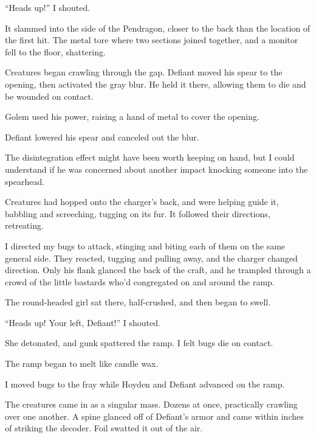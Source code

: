 ``Heads up!'' I shouted.



It slammed into the side of the Pendragon, closer to the back than the location of the first hit.  The metal tore where two sections joined together, and a monitor fell to the floor, shattering.



Creatures began crawling through the gap.  Defiant moved his spear to the opening, then activated the gray blur.  He held it there, allowing them to die and be wounded on contact.



Golem used his power, raising a hand of metal to cover the opening.



Defiant lowered his spear and canceled out the blur.



The disintegration effect might have been worth keeping on hand, but I could understand if he was concerned about another impact knocking someone into the spearhead.



Creatures had hopped onto the charger's back, and were helping guide it, babbling and screeching, tugging on its fur.  It followed their directions, retreating.



I directed my bugs to attack, stinging and biting each of them on the same general side.  They reacted, tugging and pulling away, and the charger changed direction.  Only his flank glanced the back of the craft, and he trampled through a crowd of the little bastards who'd congregated on and around the ramp.



The round-headed girl sat there, half-crushed, and then began to swell.



``Heads up!  Your left, Defiant!'' I shouted.



She detonated, and gunk spattered the ramp.  I felt bugs die on contact.



The ramp began to melt like candle wax.



I moved bugs to the fray while Hoyden and Defiant advanced on the ramp.



The creatures came in as a singular mass.  Dozens at once, practically crawling over one another.  A spine glanced off of Defiant's armor and came within inches of striking the decoder.  Foil swatted it out of the air.



